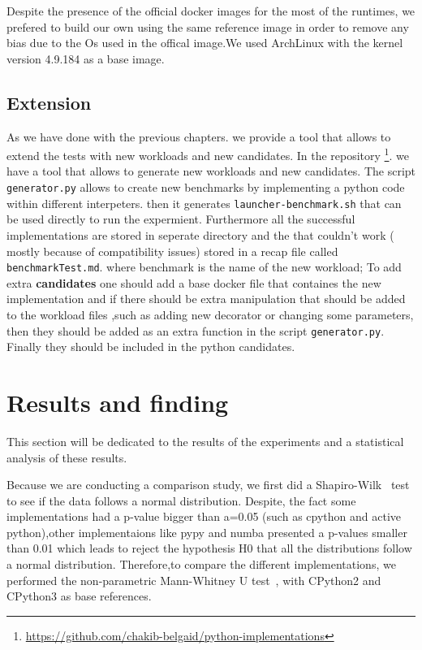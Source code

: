 Despite the presence of the official docker images for the most of the runtimes, we prefered to build our own using the same reference image in order to remove any bias due to the Os used in the offical image.We used ArchLinux with the kernel version 4.9.184 as a base image.


\subsection{Extension}
As we have done with the previous chapters. we provide a tool that allows to extend the tests with new workloads and new candidates.
In the repository \footnote{\url{https://github.com/chakib-belgaid/python-implementations}}.
we have a tool that allows to generate new workloads and new candidates.
The script \texttt{generator.py} allows to create new benchmarks by implementing a python code within different interpeters. then it generates \texttt{launcher-benchmark.sh} that can be used directly to run the expermient. Furthermore all the successful implementations are stored in seperate directory and the that couldn't work ( mostly because of compatibility issues) stored in a recap file called \texttt{benchmarkTest.md}. where benchmark is the name of the new workload;
To add extra \textbf{candidates} one should add a base docker file
that containes the new implementation and if there should be extra manipulation that should be added to the workload files ,such as adding new decorator or changing some parameters, then they should be added as an extra function in the script \texttt{generator.py}. Finally they should be included in the python candidates.

\section{Results and finding}

This section will be dedicated to the results of the experiments and a statistical analysis of these results. 

Because we are conducting a comparison study, we first did a Shapiro-Wilk~\cite{shapiro1968comparative} test to see if the data follows a normal distribution.
Despite, the fact some implementations had a p-value bigger than a=0.05 (such as cpython and active python),other implementaions like pypy and numba presented a p-values smaller than 0.01 which leads to reject the hypothesis H0 that all the distributions follow a normal distribution. 
Therefore,to compare the different implementations, we performed the non-parametric Mann-Whitney U test~\cite{zimmerman1987comparative}, with CPython2 and CPython3 as base references. 


